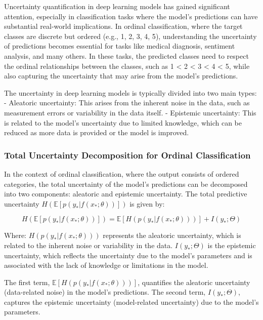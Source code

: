 \documentclass{report}
\begin{document}
Uncertainty quantification in deep learning models has gained significant attention, especially in classification tasks where the model’s predictions can have substantial real-world implications. In ordinal classification, where the target classes are discrete but ordered (e.g., {1, 2, 3, 4, 5}), understanding the uncertainty of predictions becomes essential for tasks like medical diagnosis, sentiment analysis, and many others. In these tasks, the predicted classes need to respect the ordinal relationships between the classes, such as 1 < 2 < 3 < 4 < 5, while also capturing the uncertainty that may arise from the model’s predictions.

The uncertainty in deep learning models is typically divided into two main types:
- Aleatoric uncertainty: This arises from the inherent noise in the data, such as measurement errors or variability in the data itself.
- Epistemic uncertainty: This is related to the model's uncertainty due to limited knowledge, which can be reduced as more data is provided or the model is improved.

\subsubsection{Total Uncertainty Decomposition for Ordinal Classification}

In the context of ordinal classification, where the output consists of ordered categories, the total uncertainty of the model’s predictions can be decomposed into two components: aleatoric and epistemic uncertainty. The total predictive uncertainty \( H(\mathbb{E}[p(y_* | f(x_*; \theta))]) \) is given by\cite{band2022benchmarkingbayesiandeeplearning}:

\[
H(\mathbb{E}[p(y_* | f(x_*; \theta))]) = \mathbb{E}[H(p(y_* | f(x_*; \theta)))] + I(y_*; \Theta)
\]

Where:
\( H(p(y_* | f(x_*; \theta))) \) represents the aleatoric uncertainty, which is related to the inherent noise or variability in the data.
\( I(y_*; \Theta) \) is the epistemic uncertainty, which reflects the uncertainty due to the model’s parameters and is associated with the lack of knowledge or limitations in the model.

The first term, \( \mathbb{E}[H(p(y_* | f(x_*; \theta)))] \), quantifies the aleatoric uncertainty (data-related noise) in the model’s predictions. The second term, \( I(y_*; \Theta) \), captures the epistemic uncertainty (model-related uncertainty) due to the model’s parameters.
\end{document}
